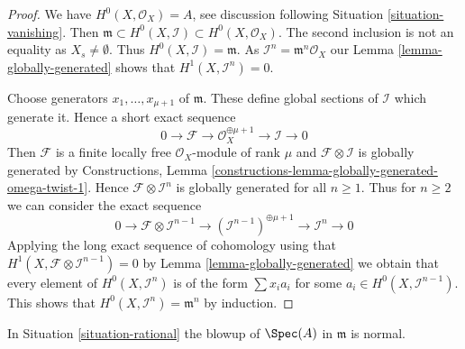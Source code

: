 \begin{proof}
We have $H^0(X, \mathcal{O}_X) = A$, see discussion following
Situation \ref{situation-vanishing}. Then
$\mathfrak m \subset H^0(X, \mathcal{I}) \subset H^0(X, \mathcal{O}_X)$.
The second inclusion is not an equality as $X_s \not = \emptyset$.
Thus $H^0(X, \mathcal{I}) = \mathfrak m$.
As $\mathcal{I}^n = \mathfrak m^n\mathcal{O}_X$ our
Lemma \ref{lemma-globally-generated} shows that $H^1(X, \mathcal{I}^n) = 0$.

\medskip\noindent
Choose generators $x_1, \ldots, x_{\mu + 1}$ of $\mathfrak m$. These define
global sections of $\mathcal{I}$ which generate it. Hence
a short exact sequence
$$
0 \to \mathcal{F} \to \mathcal{O}_X^{\oplus \mu + 1} \to \mathcal{I} \to 0
$$
Then $\mathcal{F}$ is a finite locally free $\mathcal{O}_X$-module
of rank $\mu$ and $\mathcal{F} \otimes \mathcal{I}$ is globally
generated by Constructions, Lemma
\ref{constructions-lemma-globally-generated-omega-twist-1}.
Hence $\mathcal{F} \otimes \mathcal{I}^n$
is globally generated for all $n \geq 1$. Thus for $n \geq 2$ we can
consider the exact sequence
$$
0 \to \mathcal{F} \otimes \mathcal{I}^{n - 1} \to
(\mathcal{I}^{n - 1})^{\oplus \mu + 1} \to
\mathcal{I}^n \to 0
$$
Applying the long exact sequence of cohomology using that
$H^1(X, \mathcal{F} \otimes \mathcal{I}^{n - 1}) = 0$ by
Lemma \ref{lemma-globally-generated}
we obtain that every
element of $H^0(X, \mathcal{I}^n)$ is of the form $\sum x_i a_i$
for some $a_i \in H^0(X, \mathcal{I}^{n - 1})$. This shows that
$H^0(X, \mathcal{I}^n) = \mathfrak m^n$ by induction.
\end{proof}

\begin{lemma}
\label{lemma-blow-up-normal-rational}
In Situation \ref{situation-rational}
the blowup of $\Spec(A)$ in $\mathfrak m$ is normal.
\end{lemma}

